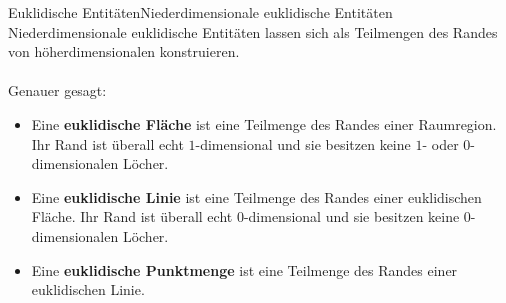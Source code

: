 \documentclass[10pt,xcolor={dvipsnames}]{beamer}
\begin{document}
\begin{frame}{Euklidische Entitäten}{Niederdimensionale euklidische Entitäten}
    Niederdimensionale euklidische Entitäten lassen sich als Teilmengen des Randes von höherdimensionalen konstruieren.\\ \ \\
    Genauer gesagt: 
    \begin{itemize}
        \item Eine \textbf{euklidische Fläche} ist eine Teilmenge des Randes einer Raumregion.
            Ihr Rand ist überall echt $1$-dimensional und sie besitzen keine $1$- oder $0$-dimensionalen Löcher.
        \item Eine \textbf{euklidische Linie} ist eine Teilmenge des Randes einer euklidischen Fläche.
            Ihr Rand ist überall echt $0$-dimensional und sie besitzen keine $0$-dimensionalen Löcher.
        \item Eine \textbf{euklidische Punktmenge} ist eine Teilmenge des Randes einer euklidischen Linie.
    \end{itemize}
\end{frame}


\end{document}
